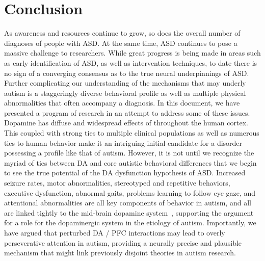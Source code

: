 \documentclass[man]{apa}
\begin{document}
\section{Conclusion}
As awareness and resources continue to grow, so does the overall number of diagnoses of people with ASD.  At the same time, ASD continues to pose a massive challenge to researchers.  While great progress is being made in areas such as early identification of ASD, as well as intervention techniques, to date there is no sign of a converging consensus as to the true neural underpinnings of ASD.  Further complicating our understanding of the mechanisms that may underly autism is a staggeringly diverse behavioral profile as well as multiple physical abnormalities that often accompany a diagnosis.  In this document, we have presented a program of research in an attempt to address some of these issues.  Dopamine has diffuse and widespread effects of throughout the human cortex. This coupled with strong ties to multiple clinical populations as well as numerous ties to human behavior make it an intriguing initial candidate for a disorder possessing a profile like that of autism.  However, it is not until we recognize the myriad of ties between DA and core autistic behavioral differences that we begin to see the true potential of the DA dysfunction hypothesis of ASD.  Increased seizure rates, motor abnormalities, stereotyped and repetitive behaviors, executive dysfunction, abnormal gaits, problems learning to follow eye gaze, and attentional abnormalities are all key components of behavior in autism, and all are linked tightly to the mid-brain dopamine system~\cite{RefWorks:99,RefWorks:100,RefWorks:102,HillEL:2004:AutismExecutiveDysfunction,Ozonoff:1991:AutismExecutiveDysfunction,RefWorks:1,RefWorks:3,RefWorks:5,RefWorks:2,RefWorks:109}, supporting the argument for a role for the dopaminergic system in the etiology of autism. Importantly, we have argued that perturbed DA / PFC interactions may lead to overly perseverative attention in autism, providing a neurally precise and plausible mechanism that might link previously disjoint theories in autism research. 
\end{document}
